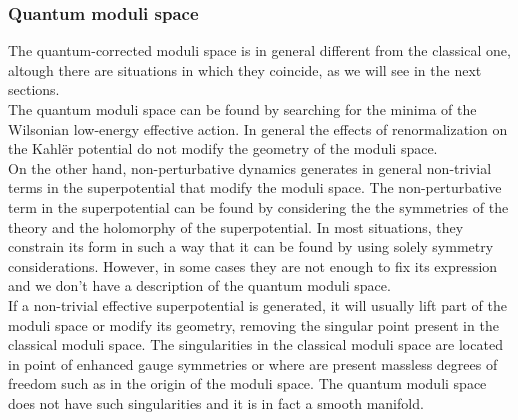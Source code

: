 \subsubsection{Quantum moduli space}
The quantum-corrected moduli space is in general different from the classical one, altough there are situations in which they coincide, as we will see in the next sections.\\
The quantum moduli space can be found by searching for the minima of  the Wilsonian low-energy effective action.
In general the effects of renormalization on the Kahl\"{e}r potential do not modify  the geometry of the moduli space.\\
On the other hand, non-perturbative dynamics generates in general non-trivial terms in the superpotential that modify the moduli space.
The non-perturbative term in the superpotential can be found by considering the the symmetries of the theory and the holomorphy of the superpotential.
In most situations, they constrain its form in such a way that it can be found by using solely symmetry considerations.
However, in some cases they are not enough to fix its expression and we don't have a description of the quantum moduli space.
\\
If a non-trivial effective superpotential is generated, it will usually lift part of the moduli space or modify its geometry, removing the singular point present in the classical moduli space.
The singularities in the classical moduli space are located in point of enhanced gauge symmetries or where are present massless degrees of freedom such as in the origin of the moduli space.
The quantum moduli space does not have such singularities and it is in fact a smooth manifold.



